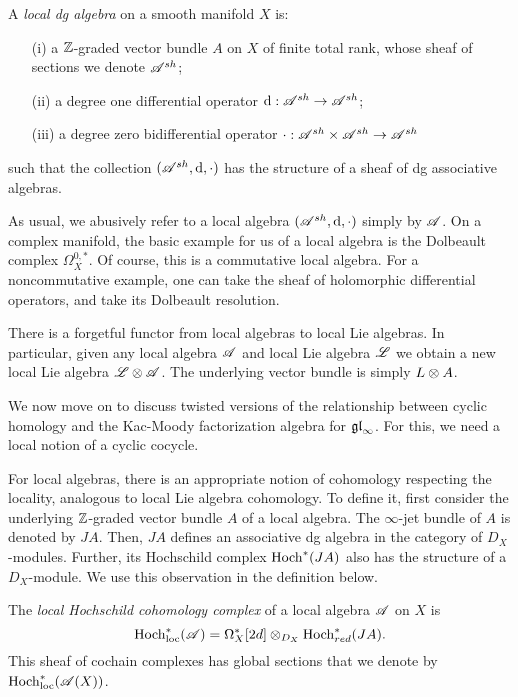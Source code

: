 \begin{dfn}
A {\em local dg algebra} on a smooth manifold $X$ is:
\begin{enumerate}
\item[(i)] a $\mathbb Z$-graded vector bundle $A$ on $X$ of finite total rank, whose sheaf of sections we denote $\mathscr A^{sh}$;
\item[(ii)] a degree one differential operator ${\rm d} : \mathscr A^{sh} \to \mathscr A^{sh}$;
\item[(iii)] a degree zero bidifferential operator $\cdot : \mathscr A^{sh} \times \mathscr A^{sh} \to \mathscr A^{sh}$
\end{enumerate}
such that the collection $(\mathscr A^{sh}, {\rm d}, \cdot)$ has the structure of a sheaf of dg associative algebras.
\end{dfn}

As usual, we abusively refer to a local algebra $(\mathscr A^{sh}, {\rm d}, \cdot)$ simply by $\mathscr A$.
On a complex manifold, the basic example for us of a local algebra is the Dolbeault complex $\Omega^{0,*}_X$. 
Of course, this is a commutative local algebra. 
For a noncommutative example, one can take the sheaf of holomorphic differential operators, and take its Dolbeault resolution. 

There is a forgetful functor from local algebras to local Lie algebras. 
In particular, given any local algebra $\mathscr A$ and local Lie algebra $\mathscr L$ we obtain a new local Lie algebra $\mathscr L \otimes \mathscr A$.
The underlying vector bundle is simply $L \otimes A$. 

We now move on to discuss twisted versions of the relationship between cyclic homology and the Kac-Moody factorization algebra for ${\mathfrak{gl}}_\infty$. 
For this, we need a local notion of a cyclic cocycle. 

For local algebras, there is an appropriate notion of cohomology respecting the locality, analogous to local Lie algebra cohomology. 
To define it, first consider the underlying $\mathbb Z$-graded vector bundle $A$ of a local algebra. 
The $\infty$-jet bundle of $A$ is denoted by $JA$.
Then, $JA$ defines an associative dg algebra in the category of $D_X$-modules. 
Further, its Hochschild complex $\Hoch^*(JA)$ also has the structure of a $D_X$-module. 
We use this observation in the definition below. 

\def\Hoch{{\rm Hoch}}
\def\Hochloc{{\rm Hoch}_{\rm loc}}
\def\Cyc{{\rm Cyc}}
\def\Cycloc{{\rm Cyc}_{\rm loc}}

\begin{dfn}\label{dfn: hochloc}
The {\em local Hochschild cohomology complex}  of a local algebra $\mathscr A$ on $X$ is 
\[
\Hochloc^*(\sA) = \Omega^*_X[2d] \tensor_{D_X} \Hoch^*_{red} (JA) .
\] 
This sheaf of cochain complexes has global sections that we denote by $\Hochloc^*(\sA(X))$.
\end{dfn}

